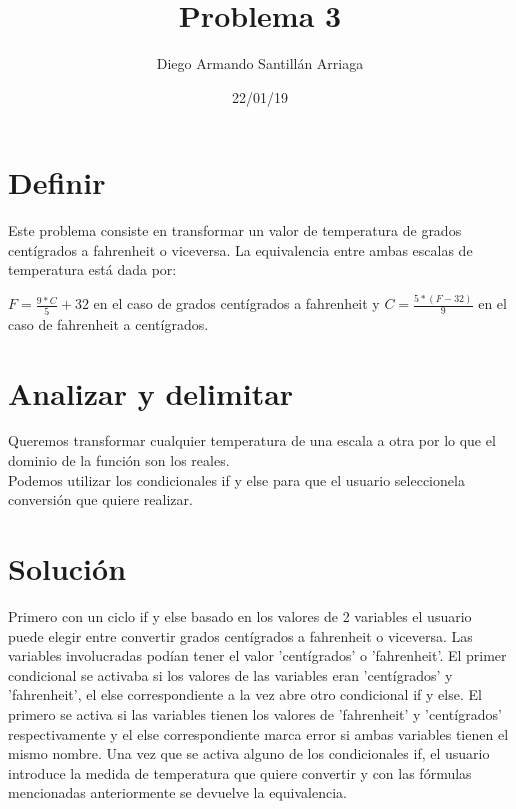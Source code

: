 \documentclass[letterpaper, 12pt, oneside]{article}%
\title{\Huge Problema 3}
\author{Diego Armando Santillán Arriaga}
\date{22/01/19}
\begin{document}
\maketitle
\newpage
\section*{Definir}
Este problema consiste en transformar un valor de temperatura de grados centígrados a fahrenheit o viceversa. La equivalencia entre ambas escalas de temperatura está dada por: 

$F = \frac{9*C}{5} + 32$ en el caso de grados centígrados a fahrenheit y $ C = \frac{5*(F-32)}{9}$ en el caso de fahrenheit a centígrados. 
\section*{Analizar y delimitar}
Queremos transformar cualquier temperatura de una escala a otra por lo que el dominio de la función son los reales. 
\\
Podemos utilizar los condicionales if y else para que el usuario seleccionela conversión que quiere realizar.  
\section*{Solución}
Primero con un ciclo if y else basado en los valores de 2 variables el usuario puede elegir entre convertir grados centígrados a fahrenheit o viceversa. Las variables involucradas podían tener el valor 'centígrados' o 'fahrenheit'. El primer condicional se activaba si los valores de las variables eran 'centígrados' y 'fahrenheit', el else correspondiente a la vez abre otro condicional if y else. El primero se activa si las variables tienen los valores de 'fahrenheit' y 'centígrados' respectivamente y el else correspondiente marca error si ambas variables tienen el mismo nombre. Una vez que se activa alguno de los condicionales if, el usuario introduce la medida de temperatura que quiere convertir y con las fórmulas mencionadas anteriormente se devuelve la equivalencia. 

	
\end{document}
